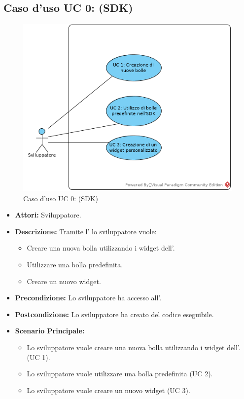\FloatBarrier
\subsection{Caso d'uso UC 0: \progetto (SDK)}
\label{Caso d'uso UC 0: \progetto (SDK)}
\begin{figure}[ht]
	\centering
	\includegraphics[scale=0.80]{Usecases/img/Monolith.png}
	\caption{Caso d'uso UC 0: \progetto(SDK)}
\end{figure}

\FloatBarrier
\begin{itemize}
\item \textbf{Attori:} Sviluppatore.
\item \textbf{Descrizione:} Tramite l' lo sviluppatore vuole:
	\begin{itemize}
	\item{Creare una nuova bolla utilizzando i widget dell'.}
	\item{Utilizzare una bolla predefinita.}
	\item{Creare un nuovo widget.}
	\end{itemize}
\item \textbf{Precondizione:} Lo sviluppatore ha accesso all'.
\item \textbf{Postcondizione:} Lo sviluppatore ha creato del codice eseguibile.
\item \textbf{Scenario Principale:}
	\begin{itemize}
	\item{Lo sviluppatore vuole creare una nuova bolla utilizzando i widget dell'.(UC 1).}
	\item{Lo sviluppatore vuole utilizzare una bolla predefinita (UC 2).}
	\item{Lo sviluppatore vuole creare un nuovo widget (UC 3).}
	\end{itemize}
\end{itemize}